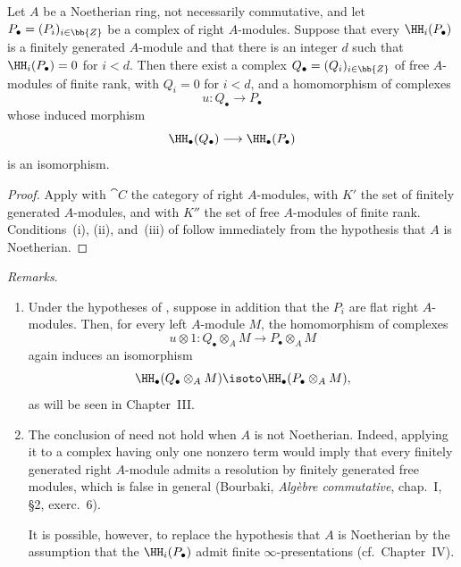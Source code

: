 \begin{corollary}[11.9.2]
\label{0.11.9.2}
Let $A$ be a Noetherian ring, not necessarily commutative, and let
$P_\bullet=(P_i)_{i\in\bb{Z}}$ be a complex of right $A$-modules.
Suppose that every $\HH_i(P_\bullet)$ is a finitely generated
$A$-module and that there is an integer $d$ such that
$\HH_i(P_\bullet)=0$ for $i<d$.
Then there exist a complex $Q_\bullet=(Q_i)_{i\in\bb{Z}}$ of free
$A$-modules of finite rank, with $Q_i=0$ for $i<d$, and a homomorphism
of complexes
\[
  u:Q_\bullet\longrightarrow P_\bullet
\]
whose induced morphism
\[
  \HH_\bullet(Q_\bullet)\longrightarrow\HH_\bullet(P_\bullet)
\]
is an isomorphism.
\end{corollary}

\begin{proof}
Apply  with $\cat{C}$ the category of right
$A$-modules, with $K'$ the set of finitely generated $A$-modules, and
with $K''$ the set of free $A$-modules of finite rank.
Conditions~(i), (ii), and~(iii) of  follow immediately
from the hypothesis that $A$ is Noetherian.
\end{proof}

\begin{env}[11.9.3]
\label{0.11.9.3}
\emph{Remarks}.
\begin{enumerate}
  \item[{\rm(i)}]
  Under the hypotheses of , suppose in addition that the
  $P_i$ are flat right $A$-modules.
  Then, for every left $A$-module $M$, the homomorphism of complexes
  \[
    u\otimes 1:
    Q_\bullet\otimes_A M
    \longrightarrow
    P_\bullet\otimes_A M
  \]
  again induces an isomorphism
  \[
    \HH_\bullet(Q_\bullet\otimes_A M)
    \isoto
    \HH_\bullet(P_\bullet\otimes_A M),
  \]
  as will be seen in Chapter~III.

  \item[{\rm(ii)}]
  The conclusion of  need not hold when $A$ is not
  Noetherian.
  Indeed, applying it to a complex having only one nonzero term would
  imply that every finitely generated right $A$-module admits a resolution by
  finitely generated free modules, which is false in general
  (Bourbaki, \emph{Alg\`ebre commutative}, chap.~I, \S2, exerc.~6).

  It is possible, however, to replace the hypothesis that $A$ is
  Noetherian by the assumption that the $\HH_i(P_\bullet)$ admit finite
  $\infty$-presentations (cf.\ Chapter~IV).
\end{enumerate}
\end{env}


